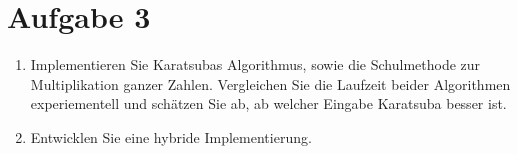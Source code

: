 \documentclass[11pt,a4paper,ngerman]{article}
\begin{document}
\section*{Aufgabe 3}

\begin{enumerate}[\bfseries (a)]

\item Implementieren Sie Karatsubas Algorithmus, sowie die Schulmethode zur Multiplikation ganzer Zahlen. Vergleichen Sie die Laufzeit beider Algorithmen experiementell und schätzen Sie ab, ab welcher Eingabe Karatsuba besser ist.

\item Entwicklen Sie eine hybride Implementierung.

\end{enumerate}

\label{LastPage}
\end{document}
